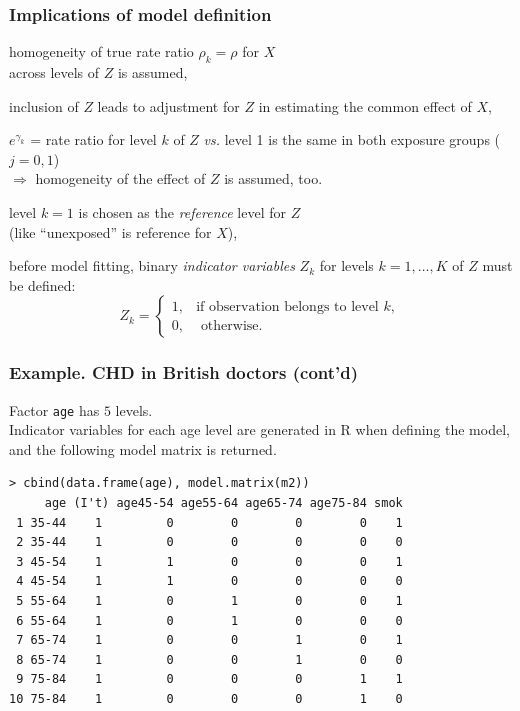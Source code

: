 \documentclass[handout, 12pt]{beamer}
\begin{document}
\begin{frame}[fragile] 
\frametitle{Implications of model definition}

\bi
\item homogeneity of true rate ratio $\rho_k = \rho$ for $X$ \\
 across levels of $Z$ is 	assumed,
	\medskip 
\item inclusion of $Z$ leads to adjustment for $Z$ in estimating the common effect of $X$,
\medskip 
\item $e^{\gamma_k}$ = rate ratio for level $k$ of $Z$ {\it vs.} level 1
      is the same in both exposure groups ($j=0,1$) \\
      $\Rightarrow$ homogeneity of
      the effect of $Z$ is assumed, too.
 \medskip     
\item level $k=1$ is chosen as the {\it reference} level for $Z$\\ (like 
	``unexposed'' is reference for $X$), 
\medskip	
\item before model fitting, binary {\it indicator variables} $Z_k$ 
	for levels $k=1, \dots, K$ of $Z$ must be defined:
	$$ Z_k  =\begin{cases}
		   1, & \mbox{if observation belongs to level } k, \\
               0, & \mbox{ otherwise}.
		   \end{cases}
	$$
\ei 
\end{frame} 



\begin{frame}[fragile] \frametitle{Example.  CHD in British doctors (cont'd)} 

Factor {\tt age} has $5$ levels. \\
Indicator variables for each age level are generated in R when defining the model, and the following model matrix is returned.
\small
\begin{verbatim}
> cbind(data.frame(age), model.matrix(m2))
     age (I't) age45-54 age55-64 age65-74 age75-84 smok
 1 35-44    1         0        0        0        0    1
 2 35-44    1         0        0        0        0    0
 3 45-54    1         1        0        0        0    1
 4 45-54    1         1        0        0        0    0
 5 55-64    1         0        1        0        0    1 
 6 55-64    1         0        1        0        0    0
 7 65-74    1         0        0        1        0    1
 8 65-74    1         0        0        1        0    0
 9 75-84    1         0        0        0        1    1
10 75-84    1         0        0        0        1    0
\end{verbatim}
\normalsize
\end{frame} 
\end{document}
